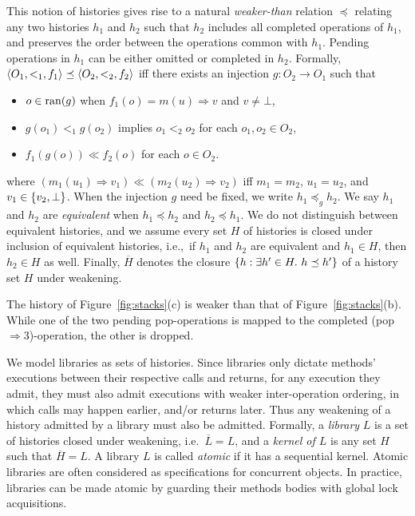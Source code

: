 This notion of histories gives rise to a natural \emph{weaker-than} relation
$\preceq$ relating any two histories $h_1$ and $h_2$ such that $h_2$ includes
all completed operations of $h_1$, and preserves the order between the
operations common with $h_1$. Pending operations in $h_1$ can be either omitted
or completed in $h_2$. Formally, ${\langle{O_1, <_1, f_1}\rangle} \preceq {\langle{O_2, <_2,
f_2}\rangle}$ if{f} there exists an injection $g: O_2 \to O_1$ such that
\begin{itemize}

  \item $o \in \operatorname{ran}(g)$ when $f_1(o) = m(u) \Rightarrow v$ and $v \neq \bot$,

  \item $g(o_1) <_1 g(o_2)$ implies $o_1 <_2 o_2$ for each $o_1, o_2 \in O_2$,

  \item $f_1(g(o)) \ll f_2(o)$ for each $o \in O_2$.

\end{itemize}
where $(m_1(u_1) \Rightarrow v_1) \ll (m_2(u_2) \Rightarrow v_2)$ if{f} $m_1 = m_2$, $u_1 = u_2$,
and $v_1 \in {\{  v_2, \bot  \}}$. When the injection $g$ need be fixed, we write
$h_1 \preceq_g h_2$. We say $h_1$ and $h_2$ are \emph{equivalent} when $h_1
\preceq h_2$ and $h_2 \preceq h_1$. We do not distinguish between equivalent
histories, and we assume every set $H$ of histories is closed under inclusion
of equivalent histories, i.e.,~if $h_1$ and $h_2$ are equivalent and $h_1 \in
H$, then $h_2 \in H$ as well. Finally, $\overline{H}$ denotes the closure
${\{  h : \exists h' \in H.\ h \preceq h'  \}}$ of a history set $H$ under
weakening.

\begin{example}

  The history of Figure~\ref{fig:stacks}(c) is weaker than that of
  Figure~\ref{fig:stacks}(b). While one of the two pending pop-operations is
  mapped to the completed (pop$\Rightarrow 3$)-operation, the other is dropped.

\end{example}

We model libraries as sets of histories. Since libraries only dictate methods'
executions between their respective calls and returns, for any execution they
admit, they must also admit executions with weaker inter-operation ordering, in
which calls may happen earlier, and/or returns later. Thus any weakening of a
history admitted by a library must also be admitted. Formally, a \emph{library}
$L$ is a set of histories closed under weakening, i.e.~$\overline{L} = L$, and
a \emph{kernel of $L$} is any set $H$ such that $\overline{H} = L$. A library
$L$ is called \emph{atomic} if it has a sequential kernel. Atomic libraries are
often considered as specifications for concurrent objects. In practice,
libraries can be made atomic by guarding their methods bodies with global lock
acquisitions.

